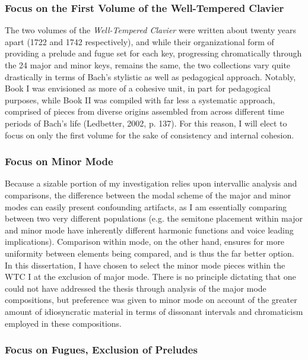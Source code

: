 \subsubsection{Focus on the First Volume of the Well-Tempered
Clavier}\label{focus-on-the-first-volume-of-the-well-tempered-clavier}

The two volumes of the \emph{Well-Tempered Clavier} were written about
twenty years apart (1722 and 1742 respectively), and while their
organizational form of providing a prelude and fugue set for each key,
progressing chromatically through the 24 major and minor keys, remains
the same, the two collections vary quite drastically in terms of Bach's
stylistic as well as pedagogical approach. Notably, Book I was
envisioned as more of a cohesive unit, in part for pedagogical purposes,
while Book II was compiled with far less a systematic approach,
comprised of pieces from diverse origins assembled from across different
time periods of Bach's life (Ledbetter, 2002, p. 137). For this reason,
I will elect to focus on only the first volume for the sake of
consistency and internal cohesion.

\subsubsection{Focus on Minor Mode}\label{focus-on-minor-mode}

Because a sizable portion of my investigation relies upon intervallic
analysis and comparisons, the difference between the modal scheme of the
major and minor modes can easily present confounding artifacts, as I am
essentially comparing between two very different populations (e.g. the
semitone placement within major and minor mode have inherently different
harmonic functions and voice leading implications). Comparison within
mode, on the other hand, ensures for more uniformity between elements
being compared, and is thus the far better option. In this dissertation,
I have chosen to select the minor mode pieces within the WTC I at the
exclusion of major mode. There is no principle dictating that one could
not have addressed the thesis through analysis of the major mode
compositions, but preference was given to minor mode on account of the
greater amount of idiosyncratic material in terms of dissonant intervals
and chromaticism employed in these compositions.

\subsubsection{Focus on Fugues, Exclusion of
Preludes}\label{focus-on-fugues-exclusion-of-preludes}

